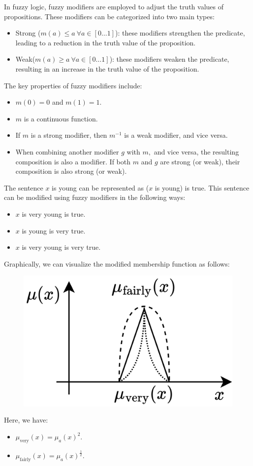 In fuzzy logic, fuzzy modifiers are employed to adjust the truth values of propositions. These modifiers can be categorized into two main types:
\begin{itemize}
    \item Strong ($m(a) \leq a \: \forall a \in [0 \dots 1]$): these modifiers strengthen the predicate, leading to a reduction in the truth value of the proposition.
    \item Weak($m(a) \geq a \: \forall a \in [0 \dots 1]$): these modifiers weaken the predicate, resulting in an increase in the truth value of the proposition.
\end{itemize}
The key properties of fuzzy modifiers include:
\begin{itemize}
    \item $m(0)=0$ and $m(1)=1$.
    \item $m$ is a continuous function. 
    \item If $m$ is a strong modifier, then $m^{-1}$ is a weak modifier, and vice versa.
    \item When combining another modifier $g$ with $m,$ and vice versa, the resulting composition is also a modifier. 
        If both $m$ and $g$ are strong (or weak), their composition is also strong (or weak).
\end{itemize}
\begin{example}
    The sentence $x$ is young can be represented as ($x$ is young) is true. 
    This sentence can be modified using fuzzy modifiers in the following ways:
    \begin{itemize}
        \item $x$ is very young is true.
        \item $x$ is young is very true.
        \item $x$ is very young is very true.
    \end{itemize}
    Graphically, we can visualize the modified membership function as follows:
    \begin{figure}[H]
        \centering
        \includegraphics[width=0.3\linewidth]{images/modifiers.png}
    \end{figure}
    Here, we have:
    \begin{itemize}
        \item $\mu_{\text{very}}(x)=\mu_a(x)^2$.
        \item $\mu_{\text{fairly}}(x)=\mu_a(x)^{\frac{1}{2}}$.
    \end{itemize}
\end{example}
